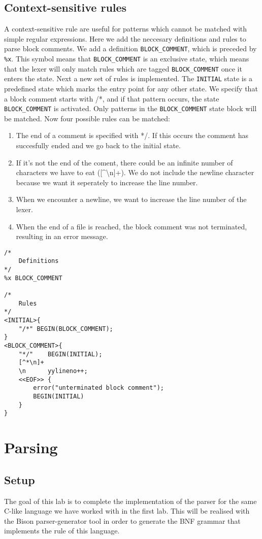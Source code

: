 \documentclass{report}
\begin{document}
	\section{Context-sensitive rules}
	A context-sensitive rule are useful for patterns which cannot be matched with simple regular expressions. Here we add the neccesary definitions and rules to parse block comments. We add a definition \texttt{BLOCK\_COMMENT}, which is preceded by \texttt{\%x}. This symbol means that \texttt{BLOCK\_COMMENT} is an exclusive state, which means that the lexer will only match rules which are tagged \texttt{BLOCK\_COMMENT} once it enters the state. Next a new set of rules is implemented. The \texttt{INITIAL} state is a predefined state which marks the entry point for any other state. We specify that a block comment starts with /*, and if that pattern occurs, the state \texttt{BLOCK\_COMMENT} is activated. Only patterns in the \texttt{BLOCK\_COMMENT} state block will be matched. Now four possible rules can be matched:
	\begin{enumerate}
		\item The end of a comment is specified with */. If this occurs the comment has succesfully ended and we go back to the initial state.
		\item If it's not the end of the coment, there could be an infinite number of characters we have to eat ([\textasciicircum *\textbackslash n]+). We do not include the newline character because we want it seperately to increase the line number.
		\item When we encounter a newline, we want to increase the line number of the lexer.
		\item When the end of a file is reached, the block comment was not terminated, resulting in an error message.
	\end{enumerate}
	\begin{lstlisting}
/*
	Definitions
*/
%x BLOCK_COMMENT

/*
	Rules
*/
<INITIAL>{
	"/*" BEGIN(BLOCK_COMMENT);
}
<BLOCK_COMMENT>{
	"*/"	BEGIN(INITIAL);
	[^*\n]+
	\n		yylineno++;
	<<EOF>> {
		error("unterminated block comment");
		BEGIN(INITIAL)
	}
}
	\end{lstlisting}
	\chapter{Parsing}
	\section{Setup}
	The goal of this lab is to complete the implementation of the parser for the same C-like language we have worked with in the first lab. This will be realised with the Bison parser-generator tool in order to generate the BNF grammar that implements the rule of this language.
	
\end{document}
